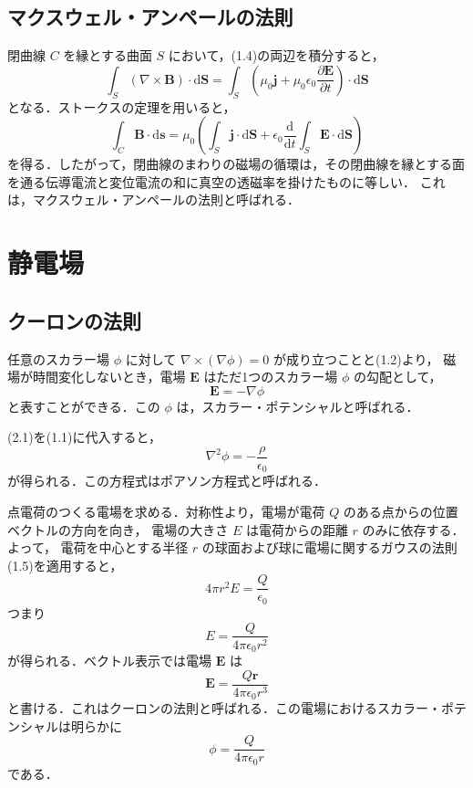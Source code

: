\documentclass[11pt, a4paper]{ltjsarticle}
\numberwithin{equation}{section}
\begin{document}
\subsection{マクスウェル・アンペールの法則}
閉曲線 $C$ を縁とする曲面 $S$ において，(1.4)の両辺を積分すると，
\[
  \int_S \left( \nabla \times \bm{B} \right) \cdot \mathrm{d}\bm{S} = \int_S \left( \mu_0 \bm{j} + \mu_0 \epsilon_0 \frac{\partial \bm{E}}{\partial t} \right) \cdot \mathrm{d}\bm{S}
\]
となる．ストークスの定理を用いると，
\begin{equation}
  \int_C \bm{B} \cdot \mathrm{d}\bm{s} = \mu_0 \left( \int_S \bm{j} \cdot \mathrm{d}\bm{S} + \epsilon_0 \frac{\mathrm{d}}{\mathrm{d}t}\int_S \bm{E} \cdot \mathrm{d}\bm{S} \right)
\end{equation}
を得る．したがって，閉曲線のまわりの磁場の循環は，その閉曲線を縁とする面を通る伝導電流と変位電流の和に真空の透磁率を掛けたものに等しい．
これは，マクスウェル・アンペールの法則と呼ばれる．

\section{静電場}
\subsection{クーロンの法則}
任意のスカラー場 $\phi$ に対して $\nabla \times \left( \nabla \phi \right) = 0$ が成り立つことと(1.2)より，
磁場が時間変化しないとき，電場 $\bm{E}$ はただ1つのスカラー場 $\phi$ の勾配として，
\begin{equation}
  \bm{E} = - \nabla \phi
\end{equation}
と表すことができる．この $\phi$ は，スカラー・ポテンシャルと呼ばれる．

(2.1)を(1.1)に代入すると，
\begin{equation}
  \nabla^{2} \phi = - \frac{\rho}{\epsilon_0}
\end{equation}
が得られる．この方程式はポアソン方程式と呼ばれる．

点電荷のつくる電場を求める．対称性より，電場が電荷 $Q$ のある点からの位置ベクトルの方向を向き，
電場の大きさ $E$ は電荷からの距離 $r$ のみに依存する．よって，
電荷を中心とする半径 $r$ の球面および球に電場に関するガウスの法則(1.5)を適用すると，
\[
  4 \pi r^{2} E = \frac{Q}{\epsilon_0}
\]
つまり
\[
  E = \frac{Q}{4 \pi \epsilon_0 r^{2}}
\]
が得られる．ベクトル表示では電場 $\bm{E}$ は
\begin{equation}
  \bm{E} = \frac{Q \bm{r}}{4 \pi \epsilon_0 r^{3}}
\end{equation}
と書ける．これはクーロンの法則と呼ばれる．この電場におけるスカラー・ポテンシャルは明らかに
\[
  \phi = \frac{Q}{4 \pi \epsilon_0 r}
\]
である．
\end{document}
